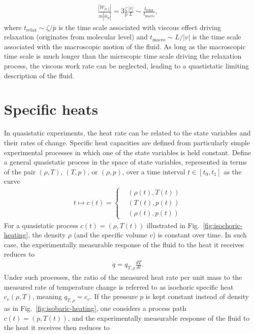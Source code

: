 \begin{example}
    \begin{align*}
        \frac{|\dot{\mathcal{W}}_{\mu,\zeta}|}{m|\dot{\bar{w}}_p|}=3\frac{\zeta}{\bar{p}}\frac{|v|}{L}\sim \frac{t_\text{relax}}{t_\text{macro}},
    \end{align*}
    where $t_\text{relax}\sim \zeta/\bar{p}$ is the time scale associated with viscous effect driving relaxation (originates from molecular level) and $t_\text{macro}\sim L/|v|$ is the time scale associated with the macroscopic motion of the fluid. As long as the macroscopic time scale is much longer than the micrscopic time scale driving the relaxation process, the viscous work rate can be neglected, leading to a quastistatic limiting description of the fluid.
\end{example}


\section{Specific heats}
In quasistatic experiments, the heat rate can be related to the state variables and their rates of change. Specific heat capacities are defined from particularly simple experimental processes in which one of the state variables is held constant. Define a general quasistatic process in the space of state variables, represented in terms of the pair $(\rho,T)$, $(T,p)$, or $(\rho,p)$, over a time interval $t\in[t_0,t_1]$ as the curve
\begin{align}
    t\mapsto c(t)=\left\{\begin{aligned}
        &(\rho(t),T(t))\\
        &(T(t),p(t))\\
        &(\rho(t),p(t))
    \end{aligned}\right.
\end{align}
For a quasistatic process $c(t)=(\rho,T(t))$ illustrated in Fig.~\ref{fig:isochoric-heating}, the density $\rho$ (and the specific volume $v$) is constant over time. In such case, the experimentally measurable response of the fluid to the heat it receives reduces to
\begin{align}
    \dot{q}=q_{T,\rho}\frac{dT}{dt}.
\end{align}
Under such processes, the ratio of the measured heat rate per unit mass to the measured rate of temperature change is referred to as isochoric specific heat $c_v(\rho,T)$, meaning $q_{T,\rho}=c_v$. If the pressure $p$ is kept constant instead of density as in Fig.~\ref{fig:isobaric-heating}, one considers a process path $c(t)=(p,T(t))$, and the experimentally measurable response of the fluid to the heat it receives then reduces to
